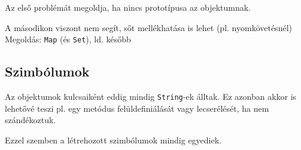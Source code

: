 \begin{frame}
    Az első problémát megoldja, ha nincs prototípusa az objektumnak.
    \begin{exampleblock}{}
        \scriptsize
        
    \end{exampleblock}
\end{frame}

\begin{frame}
    A másodikon viszont nem segít, sőt mellékhatása is lehet (pl. nyomkövetésnél)
    Megoldás: \texttt{Map} (és \texttt{Set}), ld. később
    \begin{exampleblock}{}
        
    \end{exampleblock}
\end{frame}

\subsection{Szimbólumok}

\begin{frame}
    Az objektumok kulcsaiként eddig mindig \texttt{String}-ek álltak. Ez azonban akkor is lehetővé 
    teszi pl. egy metódus felüldefiniálását vagy lecserélését, ha nem szándékoztuk.
    \begin{exampleblock}{}
        \small
        \vspace{-.2cm}
        
        \vspace{-.2cm}
    \end{exampleblock}
\end{frame}

\begin{frame}
    Ezzel szemben a létrehozott szimbólumok mindig egyediek.
    \begin{exampleblock}{}
        \scriptsize
        
    \end{exampleblock}
\end{frame}

